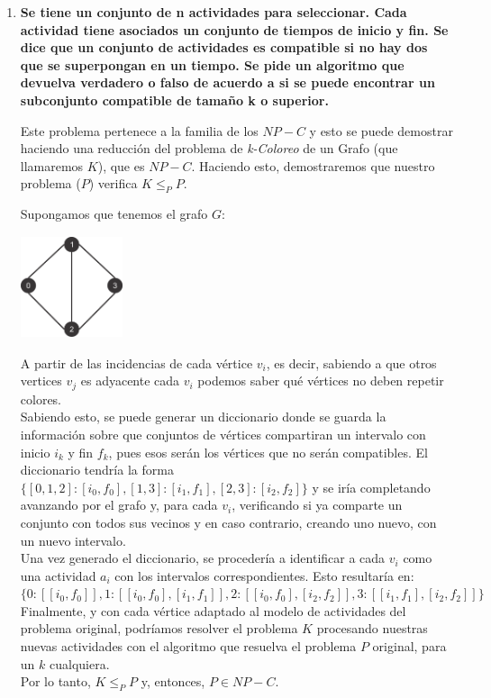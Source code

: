 \documentclass{article}
\newcommand\tab[1][0.5cm]{\hspace*{#1}}
\begin{document}
\begin{enumerate}
        \item \textbf{Se tiene un conjunto de n actividades para seleccionar. Cada actividad tiene asociados un conjunto de
            tiempos de inicio y fin. Se dice que un conjunto de actividades es compatible si no hay dos que se
            superpongan en un tiempo. Se pide un algoritmo que devuelva verdadero o falso de acuerdo a si se
            puede encontrar un subconjunto compatible de tamaño k o superior.} %

            \tab Este problema pertenece a la familia de los $NP-C$ y esto se puede demostrar haciendo una reducción
            del problema de \emph{k-Coloreo} de un Grafo (que llamaremos $K$), que es $NP-C$. Haciendo esto,
            demostraremos que nuestro problema ($P$) verifica $K \leq_{P} P$.

            \tab\tab Supongamos que tenemos el grafo $G$:
            \begin{center}
                \includegraphics[width=3cm, height=3cm]{images/Problema2}
            \end{center}
                \tab A partir de las incidencias de cada vértice $v_{i}$, es decir, sabiendo a que otros vertices $v_{j}$
                es adyacente cada $v_{i}$ podemos saber qué vértices no deben repetir colores. \\
                \tab Sabiendo esto, se puede generar un diccionario donde se guarda la información sobre que conjuntos
                de vértices compartiran un intervalo con inicio $i_{k}$ y fin $f_{k}$, pues esos serán los vértices que no
                serán compatibles. El diccionario tendría la forma
                    $\{ [0, 1, 2] : [i_{0}, f_{0}], [1, 3] : [i_{1}, f_{1}], [2, 3] : [i_{2}, f_{2}] \}$
                y se iría completando avanzando por el grafo y, para cada $v_{i}$, verificando si ya comparte un conjunto con
                todos sus vecinos y en caso contrario, creando uno nuevo, con un nuevo intervalo. \\
                \tab Una vez generado el diccionario, se procedería a identificar a cada $v_{i}$ como una actividad $a_{i}$
                con los intervalos correspondientes. Esto resultaría en:
                    $\{ 0 : [[i_{0}, f_{0}]], 1 : [[i_{0}, f_{0}], [i_{1}, f_{1}]], 2 : [[i_{0}, f_{0}], [i_{2}, f_{2}]],
                    3 : [[i_{1}, f_{1}], [i_{2}, f_{2}]] \}$ \\
                \tab Finalmente, y con cada vértice adaptado al modelo de actividades del problema original, podríamos
                resolver el problema $K$ procesando nuestras nuevas actividades con el algoritmo
                que resuelva el problema $P$ original, para un $k$ cualquiera. \\
                \tab Por lo tanto, $K \leq_{P} P$ y, entonces, $P \in NP-C$.


\end{enumerate}
\end{document}
